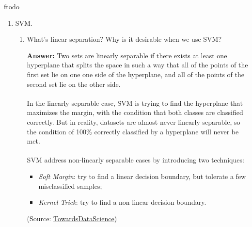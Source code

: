 ƒtodo\documentclass{article}
\newenvironment{QandA}{\begin{enumerate}[label=\arabic*.]}{\end{enumerate}}
\newenvironment{InnerQandA}{\begin{enumerate}[label=\roman*.]}{\end{enumerate}}
\newenvironment{answer}{\par\normalfont \textbf{Answer:}}{}
\begin{document}
\begin{QandA}
\begin{InnerQandA}
\begin{answer}
        \end{answer}

        \item What problems is gradient boosting good for?
        \begin{answer}
            Gradient Boosting is most useful with tabular/structured data, where interpretability is not required, and there are no strict latency constraints for model prediction time.
        \end{answer}
    \end{InnerQandA}

    \item SVM.
    \begin{InnerQandA}
        \item What’s linear separation? Why is it desirable when we use SVM?
        \begin{answer}
            Two sets are linearly separable if there exists at least one hyperplane that splits the space in such a way that all of the points of the first set lie on one one side of the hyperplane, and all of the points of the second set lie on the other side. \\\\
            In the linearly separable case, SVM is trying to find the hyperplane that maximizes the margin, with the condition that both classes are classified correctly. But in reality, datasets are almost never linearly separable, so the condition of 100\% correctly classified by a hyperplane will never be met.\\\\
            SVM address non-linearly separable cases by introducing two techniques:
            \begin{itemize}
                \item \textit{Soft Margin}: try to find a linear decision boundary, but tolerate a few misclassified samples;
                \item \textit{Kernel Trick}: try to find a non-linear decision boundary.
            \end{itemize}

            (Source: \href{https://towardsdatascience.com/support-vector-machine-simply-explained-fee28eba5496}{TowardsDataScience})
        \end{answer}


\end{InnerQandA}
\end{QandA}
\end{document}
